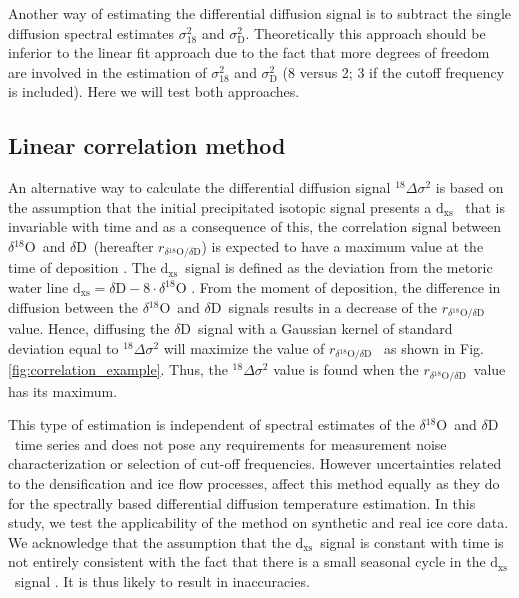 \documentclass[11pt, draftcls, onecolumn]{IEEEtran} %
\numberwithin{equation}{section}
\numberwithin{table}{section}
\numberwithin{figure}{section}
\newcommand{\delOx}{$\delta{}^{18}\mathrm{O}$}
\newcommand{\delD}{$\delta\mathrm{D}$}
\newcommand{\Dxs}{$\mathrm{d_{xs}}$}
\newcommand{\delcorrel}{$r_{\delta{}^{18}\mathrm{O}/\delta\mathrm{D}}$}
\begin{document}
Another  way of estimating the differential diffusion signal is to subtract the single diffusion 
spectral estimates $\sigma^2_{18}$ and $\sigma^2_{\mathrm{D}}$. 
Theoretically this approach should be inferior to the linear fit approach due to the fact that 
more degrees of freedom are involved in the estimation of $\sigma^2_{18}$ and 
$\sigma^2_{\mathrm{D}}$ (8 versus 2; 3 if the cutoff frequency is included).
Here we will test both approaches.



\subsection*{Linear correlation method}
An alternative way to calculate the differential diffusion signal ${}^{18}\Delta\sigma^2$
is based on the assumption that the initial precipitated isotopic signal presents a \Dxs~
that is invariable with time and as a consequence of this, the correlation signal between \delOx~and \delD~(hereafter \delcorrel) is expected
to have a maximum value at the time of deposition .
The \Dxs~signal is defined as the deviation from the metoric water line $\mathrm{d_{xs}}= \delta\mathrm{D}- 8\cdot\delta^{18}\mathrm{O} $ \citep{craig, Dansgaard}.
From the moment of deposition, the difference in diffusion between the \delOx~and \delD~signals results
in a decrease of the \delcorrel~ value. Hence, diffusing the \delD~signal 
with a Gaussian kernel of standard deviation equal to ${}^{18}\Delta\sigma^2$ will maximize 
the value of \delcorrel~\citep{vanderWel2015a} as shown in Fig. \ref{fig:correlation_example}.  
Thus, the ${}^{18}\Delta\sigma^2$ value is found when the \delcorrel~value has its maximum.

This type of estimation is independent of spectral estimates of the \delOx~and \delD~time series
and does not pose any requirements for measurement noise characterization or selection of
cut-off frequencies. However uncertainties related to the densification and ice flow processes, affect
this method equally as they do for the spectrally based differential diffusion temperature estimation. 
In this study, we test the applicability of the method on synthetic and real ice core data.
We acknowledge that the assumption that the \Dxs~signal is constant with time is 
not entirely consistent with the fact that there is a small seasonal cycle in the \Dxs~signal \citep{Johnsen1989}.
It is thus likely to result in inaccuracies.
\end{document}
